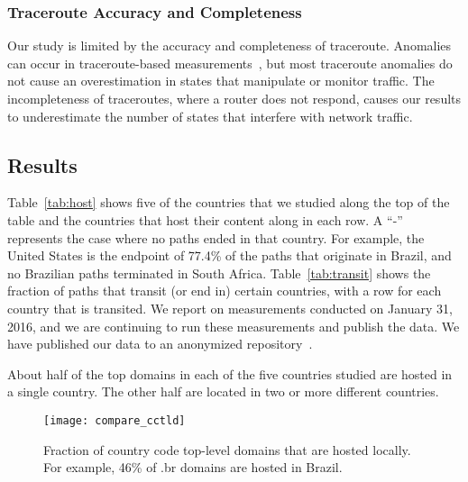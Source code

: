 \subsubsection{Traceroute Accuracy and Completeness}
Our study is limited by the accuracy and completeness of traceroute.
Anomalies can occur in traceroute-based
measurements~\cite{augustin2006avoiding}, but most traceroute anomalies
do not cause an overestimation in states that manipulate or monitor traffic.  The
incompleteness of traceroutes, where a router does not respond, causes
our results to underestimate the number of states that interfere with network 
traffic.


\subsection{Results}



Table~\ref{tab:host} shows five of the countries that we studied along the top
of the table and the countries that host their content along in each row.  A
``-'' represents the case where no paths ended in that country. For example,
the United States is the endpoint of 77.4\% of the paths that originate in
Brazil, and no Brazilian paths terminated in South Africa.
Table~\ref{tab:transit} shows the fraction of paths that transit (or end in)
certain countries, with a row for each country that is transited.  We report 
on measurements conducted on January 31, 2016, and we are continuing to run 
these measurements and publish the data.  We have published our data 
to an anonymized repository~\cite{ransom_data}.

\begin{finding} About half of the top domains in each of
the five countries studied are hosted in a single country.  The other half are
located in two or more different countries. \end{finding} 

\begin{figure}[b]
\centering
\texttt{[image: compare\_cctld]}
\caption{Fraction of country code top-level domains that are hosted locally. For example, 46\% of .br domains are hosted in Brazil.}
\label{fig:cctld_graph}
\end{figure}

